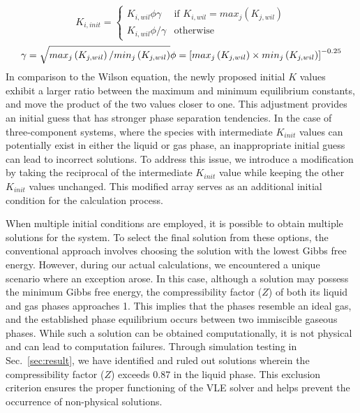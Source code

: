 \begin{equation} 
K_{i,init} = 
\begin{cases}
 K_{i,wil}\phi\gamma  &\text{if }  K_{i,wil} = max_j \left(K_{j,wil}\right) \\
 K_{i,wil}\phi/\gamma & \text{otherwise} 
\end{cases}  
\end{equation}
\begin{equation}
\gamma = \sqrt{max_j \left(K_{j,wil}\right) / min_j \left(K_{j,wil}\right)}\\
\phi = \left[max_j \left(K_{j,wil}\right) \times min_j \left(K_{j,wil}\right)\right]^{-0.25}
\end{equation}
In comparison to the Wilson equation, the newly proposed initial $K$ values exhibit a larger ratio between the maximum and minimum equilibrium constants, and move the product of the two values closer to one. This adjustment provides an initial guess that has stronger phase separation tendencies.
In the case of three-component systems, where the species with intermediate $K_{init}$ values can potentially exist in either the liquid or gas phase, an inappropriate initial guess can lead to incorrect solutions. To address this issue, we introduce a modification by taking the reciprocal of the intermediate $K_{init}$ value while keeping the other $K_{init}$ values unchanged. This modified array serves as an additional initial condition for the calculation process.

When multiple initial conditions are employed, it is possible to obtain multiple solutions for the system. To select the final solution from these options, the conventional approach involves choosing the solution with the lowest Gibbs free energy. However, during our actual calculations, we encountered a unique scenario where an exception arose. In this case, although a solution may possess the minimum Gibbs free energy, the compressibility factor ($Z$) of both its liquid and gas phases approaches 1. This implies that the phases resemble an ideal gas, and the established phase equilibrium occurs between two immiscible gaseous phases. While such a solution can be obtained computationally, it is not physical and can lead to computation failures. Through simulation testing in Sec.~\ref{sec:result}, we have identified and ruled out solutions wherein the compressibility factor ($Z$) exceeds 0.87 in the liquid phase. This exclusion criterion ensures the proper functioning of the VLE solver and helps prevent the occurrence of non-physical solutions.

